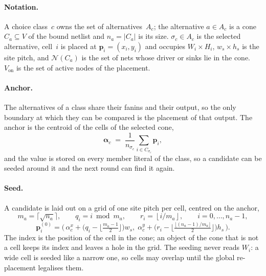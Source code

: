 %

\paragraph{Notation.}
A choice class~$c$ owns the set of alternatives~$A_c$; the alternative
$a\in A_c$ is a cone~$C_a\subseteq V$ of the bound netlist and
$n_a=|C_a|$ is its size.  $\sigma_c\in A_c$ is the selected alternative,
cell~$i$ is placed at $\mathbf p_i=(x_i,y_i)$ and occupies
$W_i\times H_i$, $w_s\times h_s$ is the site pitch, and
$\mathcal N(C_a)$ is the set of nets whose driver or sinks lie in the
cone.  $V_{\mathrm{on}}$ is the set of active nodes of the placement.

\paragraph{Anchor.}
The alternatives of a class share their fanins and their output, so the
only boundary at which they can be compared is the placement of that
output.  The anchor is the centroid of the cells of the selected cone,
\begin{equation}
  \boldsymbol\alpha_c
  \;=\; \frac{1}{n_{\sigma_c}}\sum_{i\in C_{\sigma_c}} \mathbf p_i ,
  \label{eq:anchor}
\end{equation}
and the value is stored on every member literal of the class, so a
candidate can be seeded around it and the next round can find it again.

\paragraph{Seed.}
A candidate is laid out on a grid of one site pitch per cell, centred on
the anchor,
\begin{equation}
  m_a=\lceil\sqrt{n_a}\rceil,\qquad
  q_i=i\bmod m_a,\qquad
  r_i=\left\lfloor i/m_a\right\rfloor,\qquad
  i=0,\dots,n_a-1,
  \label{eq:grid}
\end{equation}
\begin{equation}
  \mathbf p_i^{(0)} =
  \Big(\,
    \alpha_c^{x}+\big(q_i-\lfloor\tfrac{m_a-1}{2}\rfloor\big)w_s,\;
    \alpha_c^{y}+\big(r_i-\lfloor\tfrac{\lfloor (n_a-1)/m_a\rfloor}{2}\rfloor\big)h_s
  \,\Big).
  \label{eq:seed}
\end{equation}
The index is the position of the cell in the cone; an object of the cone
that is not a cell keeps its index and leaves a hole in the grid.  The
seeding never reads $W_i$: a wide cell is seeded like a narrow one, so
cells may overlap until the global re-placement legalises them.

